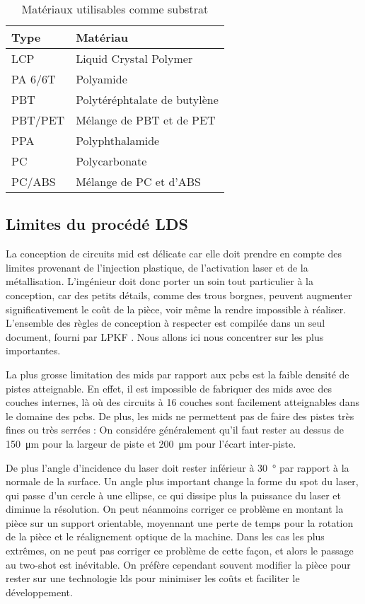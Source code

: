 \begin{table}[h]
\centering
\begin{tabular}{l l}
\toprule 
Type & Matériau \\
\midrule %
LCP & Liquid Crystal Polymer \\
PA 6/6T & Polyamide \\
PBT & Polytéréphtalate de butylène \\
PBT/PET & Mélange de PBT et de PET \\
PPA & Polyphthalamide \\
PC & Polycarbonate \\
PC/ABS & Mélange de PC et d'ABS \\ 
\bottomrule 
\end{tabular}
\caption{Matériaux utilisables comme substrat}
\label{tab:mid-materials}
\end{table}

\subsection{Limites du procédé LDS}
La conception de circuits \gls{mid} est délicate car elle doit prendre en compte des limites provenant de l'injection plastique, de l'activation laser et de la métallisation.
L'ingénieur doit donc porter un soin tout particulier à la conception, car des petits détails, comme des trous borgnes, peuvent augmenter significativement le coût de la pièce, voir même la rendre impossible à réaliser.
L'ensemble des règles de conception à respecter est compilée dans un seul document, fourni par LPKF \cite{mid-design-rules}.
Nous allons ici nous concentrer sur les plus importantes.

La plus grosse limitation des \glspl{mid} par rapport aux \glspl{pcb} est la faible densité de pistes atteignable.
En effet, il est impossible de fabriquer des \glspl{mid} avec des couches internes, là où des circuits à 16 couches sont facilement atteignables dans le domaine des \glspl{pcb}.
De plus, les \glspl{mid} ne permettent pas de faire des pistes très fines ou très serrées : On considére généralement qu'il faut rester au dessus de \SI{150}{\micro\meter} pour la largeur de piste et \SI{200}{\micro\meter} pour l'écart inter-piste.

De plus l'angle d'incidence du laser doit rester inférieur à \SI{30}{\degree} par rapport à la normale de la surface.
Un angle plus important change la forme du spot du laser, qui passe d'un cercle à une ellipse, ce qui dissipe plus la puissance du laser et diminue la résolution.
On peut néanmoins corriger ce problème en montant la pièce sur un support orientable, moyennant une perte de temps pour la rotation de la pièce et le réalignement optique de la machine.
Dans les cas les plus extrêmes, on ne peut pas corriger ce problème de cette façon, et alors le passage au two-shot est inévitable.
On préfère cependant souvent modifier la pièce pour rester sur une technologie \gls{lds} pour minimiser les coûts et faciliter le développement.

